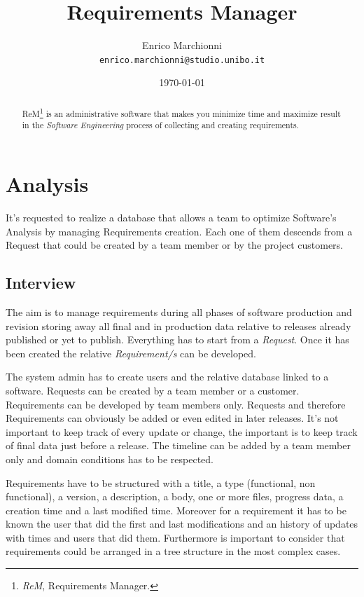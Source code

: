 \documentclass[12pt, a4paper]{report}
\title{
    Requirements Manager
}
\author{
    Enrico Marchionni\\
    \texttt{enrico.marchionni@studio.unibo.it}
}
\date{\today}
\begin{document}
\maketitle

\begin{abstract}

ReM\footnote{\emph{ReM}, Requirements Manager.} is an administrative software that makes you minimize time and maximize result in
the \emph{Software Engineering} process of collecting and creating requirements.

\end{abstract}

\tableofcontents

\chapter*{Analysis}
\label{chap:analysis}

It's requested to realize a database that allows a team to optimize Software's Analysis by managing Requirements creation.
Each one of them descends from a Request that could be created by a team member or by the project customers.

\section*{Interview}
\label{sec:interview}

The aim is to manage requirements during all phases of software production and revision storing away all final and in production
data relative to releases already published or yet to publish. Everything has to start from a \emph{Request}.
Once it has been created the relative \emph{Requirement/s} can be developed.

The system admin has to create users and the relative database linked to a software.
Requests can be created by a team member or a customer. Requirements can be developed by team members only. Requests and therefore
Requirements can obviously be added or even edited in later releases. It's not important to keep track of every update or change,
the important is to keep track of final data just before a release. The timeline can be added by a team member only and domain
conditions has to be respected.

Requirements have to be structured with a title, a type (functional, non functional), a version, a description, a body, one or
more files, progress data, a creation time and a last modified time. Moreover for a requirement it has to be known
the user that did the first and last modifications and an history of updates with times and users that did them. Furthermore is
important to consider that requirements could be arranged in a tree structure in the most complex cases.
\end{document}
